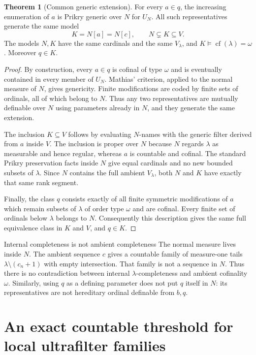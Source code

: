 \documentclass[11pt,letterpaper]{article}
\theoremstyle{definition}
\newtheorem{theorem}[definition]{Theorem}
\numberwithin{equation}{section}
\newcommand{\cf}{\operatorname{cf}}
\begin{document}
\begin{theorem}[Common generic extension]\label{thm:commoncore}
For every $a\in q$, the increasing enumeration of $a$ is Prikry generic over $N$ for $U_N$. All such representatives generate the same model
\[
 K=N[a]=N[c],\qquad N\subsetneq K\subseteq V.
\]
The models $N,K$ have the same cardinals and the same $V_\lambda$, and $K\models\cf(\lambda)=\omega$. Moreover $q\in K$.
\end{theorem}
\begin{proof}
By construction, every $a\in q$ is cofinal of type $\omega$ and is eventually contained in every member of $U_N$. Mathias' criterion, applied to the normal measure of $N$, gives genericity. Finite modifications are coded by finite sets of ordinals, all of which belong to $N$. Thus any two representatives are mutually definable over $N$ using parameters already in $N$, and they generate the same extension.

The inclusion $K\subseteq V$ follows by evaluating $N$-names with the generic filter derived from $a$ inside $V$. The inclusion is proper over $N$ because $N$ regards $\lambda$ as measurable and hence regular, whereas $a$ is countable and cofinal. The standard Prikry preservation facts inside $N$ give equal cardinals and no new bounded subsets of $\lambda$. Since $N$ contains the full ambient $V_\lambda$, both $N$ and $K$ have exactly that same rank segment.

Finally, the class $q$ consists exactly of all finite symmetric modifications of $a$ which remain subsets of $\lambda$ of order type $\omega$ and are cofinal. Every finite set of ordinals below $\lambda$ belongs to $N$. Consequently this description gives the same full equivalence class in $K$ and $V$, and $q\in K$.
\end{proof}

\begin{assessment}{Internal completeness is not ambient completeness}
The normal measure lives inside $N$. The ambient sequence $c$ gives a countable family of measure-one tails $\lambda\setminus(c_n+1)$ with empty intersection. That family is not a sequence in $N$. Thus there is no contradiction between internal $\lambda$-completeness and ambient cofinality $\omega$. Similarly, using $q$ as a defining parameter does not put $q$ itself in $N$: its representatives are not hereditary ordinal definable from $b,q$.
\end{assessment}

\section{An exact countable threshold for local ultrafilter families}\label{sec:ultrafilters}
\end{document}
